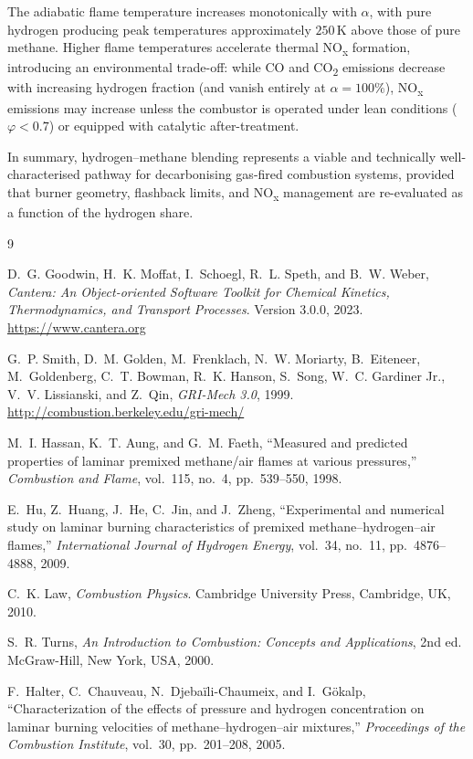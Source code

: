 \documentclass[12pt,a4paper]{article}
\newcommand{\phisym}{\varphi}
\newcommand{\alphasym}{\alpha}
\begin{document}
The adiabatic flame temperature increases monotonically with \(\alphasym\), with pure hydrogen producing peak temperatures approximately \(250\,\mathrm{K}\) above those of pure methane. Higher flame temperatures accelerate thermal NO\textsubscript{x} formation, introducing an environmental trade-off: while CO and CO\textsubscript{2} emissions decrease with increasing hydrogen fraction (and vanish entirely at \(\alphasym = 100\%\)), NO\textsubscript{x} emissions may increase unless the combustor is operated under lean conditions (\(\phisym < 0.7\)) or equipped with catalytic after-treatment.

In summary, hydrogen--methane blending represents a viable and technically well-characterised pathway for decarbonising gas-fired combustion systems, provided that burner geometry, flashback limits, and NO\textsubscript{x} management are re-evaluated as a function of the hydrogen share.

\begin{thebibliography}{9}

D.~G. Goodwin, H.~K. Moffat, I.~Schoegl, R.~L. Speth, and B.~W. Weber,
\textit{Cantera: An Object-oriented Software Toolkit for Chemical Kinetics, Thermodynamics, and Transport Processes}.
Version 3.0.0, 2023.
\url{https://www.cantera.org}

G.~P. Smith, D.~M. Golden, M.~Frenklach, N.~W. Moriarty, B.~Eiteneer, M.~Goldenberg,
C.~T. Bowman, R.~K. Hanson, S.~Song, W.~C. Gardiner Jr., V.~V. Lissianski, and Z.~Qin,
\textit{GRI-Mech 3.0}, 1999.
\url{http://combustion.berkeley.edu/gri-mech/}

M.~I. Hassan, K.~T. Aung, and G.~M. Faeth,
``Measured and predicted properties of laminar premixed methane/air flames at various pressures,''
\textit{Combustion and Flame}, vol.~115, no.~4, pp.~539--550, 1998.

E.~Hu, Z.~Huang, J.~He, C.~Jin, and J.~Zheng,
``Experimental and numerical study on laminar burning characteristics of premixed methane--hydrogen--air flames,''
\textit{International Journal of Hydrogen Energy}, vol.~34, no.~11, pp.~4876--4888, 2009.

C.~K. Law,
\textit{Combustion Physics}.
Cambridge University Press, Cambridge, UK, 2010.

S.~R. Turns,
\textit{An Introduction to Combustion: Concepts and Applications}, 2nd ed.
McGraw-Hill, New York, USA, 2000.

F.~Halter, C.~Chauveau, N.~Djebaïli-Chaumeix, and I.~Gökalp,
``Characterization of the effects of pressure and hydrogen concentration on laminar burning velocities of methane--hydrogen--air mixtures,''
\textit{Proceedings of the Combustion Institute}, vol.~30, pp.~201--208, 2005.

\end{thebibliography}
\end{document}
